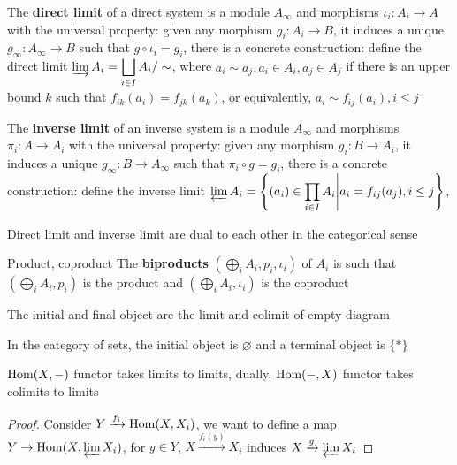 \documentclass[main]{subfiles}
\begin{document}
\begin{definition}
The \textbf{direct limit} of a direct system is a module $A_\infty$ and morphisms $\iota_i:A_i\to A$ with the universal property: given any morphism $g_i:A_i\to B$, it induces a unique $g_\infty:A_\infty\to B$ such that $g\circ\iota_i=g_i$, there is a concrete construction: define the direct limit $\varinjlim A_i=\displaystyle\bigsqcup_{i\in I}A_i/\sim$, where $a_i\sim a_j, a_i\in A_i,a_j\in A_j$ if there is an upper bound $k$ such that $f_{ik}(a_i)=f_{jk}(a_k)$, or equivalently, $a_i\sim f_{ij}(a_i),i\leq j$
\end{definition}

\begin{definition}
The \textbf{inverse limit} of an inverse system is a module $A_\infty$ and morphisms $\pi_i:A\to A_i$ with the universal property: given any morphism $g_i:B\to A_i$, it induces a unique $g_\infty:B\to A_\infty$ such that $\pi_i\circ g=g_i$, there is a concrete construction: define the inverse limit $\varprojlim A_i=\displaystyle\left\{(a_i)\in\prod_{i\in I}A_i\middle|a_i=f_{ij}(a_j),i\leq j\right\}$, 
\end{definition}

\begin{remark}
Direct limit and inverse limit are dual to each other in the categorical sense
\end{remark}

\begin{definition}
Product, coproduct
The \textbf{biproducts} $(\bigoplus_iA_i,p_i,\iota_i)$ of $A_i$ is such that $(\bigoplus_iA_i,p_i)$ is the product and $(\bigoplus_iA_i,\iota_i)$ is the coproduct
\end{definition}

\begin{remark}
The initial and final object are the limit and colimit of empty diagram \par
In the category of sets, the initial object is $\varnothing$ and a terminal object is $\{*\}$
\end{remark}

\begin{lemma}
$\operatorname{Hom}(X,-)$ functor takes limits to limits, dually, $\operatorname{Hom}(-,X)$ functor takes colimits to limits
\end{lemma}

\begin{proof}
Consider $Y\xrightarrow{f_i}\operatorname{Hom}(X,X_i)$, we want to define a map $Y\to\operatorname{Hom}(X,\varprojlim X_i)$, for $y\in Y$, $X\xrightarrow{f_i(y)} X_i$ induces $X\xrightarrow g\varprojlim X_i$
\end{proof}
\end{document}
